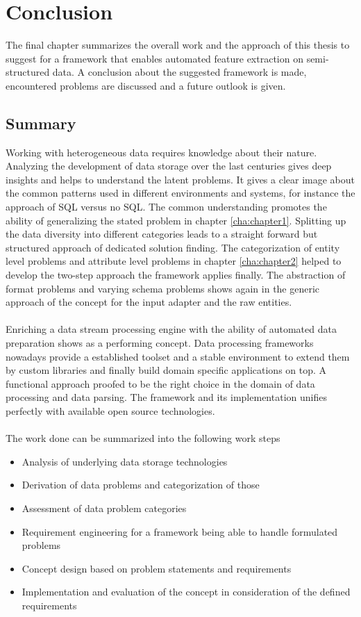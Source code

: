 \chapter{Conclusion\label{cha:chapter7}}

The final chapter summarizes the overall work and the approach of this thesis to suggest for a framework that enables automated feature extraction on semi-structured data. A conclusion about the suggested framework is made, encountered problems are discussed and a future outlook is given.  

\section{Summary\label{sec:summary}}

Working with heterogeneous data requires knowledge about their nature. Analyzing the development of data storage over the last centuries gives deep insights and helps to understand the latent problems. It gives a clear image about the common patterns used in different environments and systems, for instance the approach of SQL versus no SQL. The common understanding promotes the ability of generalizing the stated problem in chapter \ref{cha:chapter1}. Splitting up the data diversity into different categories leads to a straight forward but structured approach of dedicated solution finding. The categorization of entity level problems and attribute level problems in chapter \ref{cha:chapter2} helped to develop the two-step approach the framework applies finally. The abstraction of format problems and varying schema problems shows again in the generic approach of the concept for the input adapter and the raw entities.
\\\\
Enriching a data stream processing engine with the ability of automated data preparation shows as a performing concept. Data processing frameworks nowadays provide a established toolset and a stable environment to extend them by custom libraries and finally build domain specific applications on top. A functional approach proofed to be the right choice in the domain of data processing and data parsing. The framework and its implementation unifies perfectly with available open source technologies. 
\\\\
\noindent The work done can be summarized into the following work steps

\begin{itemize}
\item Analysis of underlying data storage technologies
\item Derivation of data problems and categorization of those
\item Assessment of data problem categories
\item Requirement engineering for a framework being able to handle formulated problems
\item Concept design based on problem statements and requirements
\item Implementation and evaluation of the concept in consideration of the defined requirements
\end{itemize}


